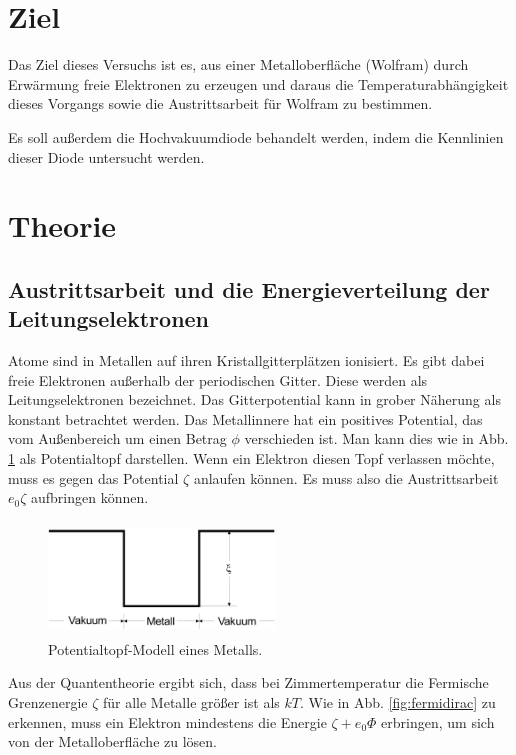 \section{Ziel}
Das Ziel dieses Versuchs ist es, aus einer Metalloberfläche
(Wolfram) durch Erwärmung freie Elektronen zu erzeugen und
daraus die Temperaturabhängigkeit dieses Vorgangs sowie die
Austrittsarbeit für Wolfram zu bestimmen.

\noindent Es soll außerdem die Hochvakuumdiode behandelt werden,
indem die Kennlinien dieser Diode untersucht werden.

\section{Theorie}
\label{sec:Theorie}

\subsection{Austrittsarbeit und die Energieverteilung der Leitungselektronen}

Atome sind in Metallen auf ihren Kristallgitterplätzen 
ionisiert. Es gibt dabei freie Elektronen außerhalb 
der periodischen Gitter. Diese werden als Leitungselektronen 
bezeichnet. Das Gitterpotential kann in grober Näherung als 
konstant betrachtet werden. Das Metallinnere hat ein positives 
Potential, das vom Außenbereich um einen Betrag $\phi$ 
verschieden ist. Man kann dies wie in Abb. \ref{fig:topf}
als Potentialtopf darstellen. Wenn ein Elektron diesen Topf 
verlassen möchte, muss es gegen das Potential $\zeta$ 
anlaufen können. Es muss also die Austrittsarbeit $e_0 \zeta$ 
aufbringen können. 

\begin{figure}
    \centering
    \includegraphics[width=6cm, height=3cm]{build/potentialtopf.png}
    \caption{Potentialtopf-Modell eines Metalls. \cite{V504}}
    \label{fig:topf}
\end{figure}

\noindent Aus der Quantentheorie ergibt sich, dass bei Zimmertemperatur 
die Fermische Grenzenergie $\zeta$ für alle Metalle größer ist 
als $k T$. Wie in Abb. \ref{fig:fermidirac} zu erkennen, muss
ein Elektron mindestens die Energie $\zeta + e_0 \Phi$ 
erbringen, um sich von der Metalloberfläche zu lösen. 

